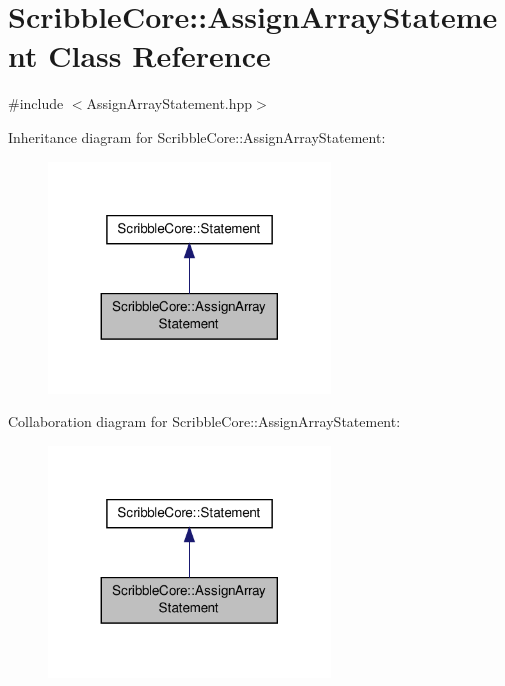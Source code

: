 \hypertarget{class_scribble_core_1_1_assign_array_statement}{\section{Scribble\-Core\-:\-:Assign\-Array\-Statement Class Reference}
\label{class_scribble_core_1_1_assign_array_statement}
}


{\ttfamily \#include $<$Assign\-Array\-Statement.\-hpp$>$}



Inheritance diagram for Scribble\-Core\-:\-:Assign\-Array\-Statement\-:
\nopagebreak
\begin{figure}[H]
\begin{center}
\leavevmode
\includegraphics[width=212pt]{class_scribble_core_1_1_assign_array_statement__inherit__graph}
\end{center}
\end{figure}


Collaboration diagram for Scribble\-Core\-:\-:Assign\-Array\-Statement\-:
\nopagebreak
\begin{figure}[H]
\begin{center}
\leavevmode
\includegraphics[width=212pt]{class_scribble_core_1_1_assign_array_statement__coll__graph}
\end{center}
\end{figure}
